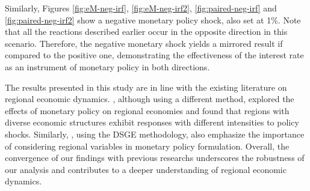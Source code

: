 \documentclass[../thesis.tex]{subfiles}
\begin{document}
Similarly, Figures \eqref{fig:eM-neg-irf}, \eqref{fig:eM-neg-irf2}, \eqref{fig:paired-neg-irf} and \eqref{fig:paired-neg-irf2} show a negative monetary policy shock, also set at 1\%. Note that all the reactions described earlier occur in the opposite direction in this scenario. Therefore, the negative monetary shock yields  a mirrored result if compared to the positive one, demonstrating the effectiveness of the interest rate as an instrument of monetary policy in both directions. %

The results presented in this study are in line with the existing literature on regional economic dynamics. \textcite{bertanha_efeitos_2008}, although using a different method, explored the effects of monetary policy on regional economies and found that regions with diverse economic structures exhibit responses with different intensities to policy shocks. Similarly, \textcite{osterno_uma_2022}, using the DSGE methodology, also emphasize the importance of considering regional variables in monetary policy formulation. Overall, the convergence of our findings with previous researchs underscores the robustness of our analysis and contributes to a deeper understanding of regional economic dynamics.

\begin{comment}
	
	\begin{align}
		&\Delta \hat{Z}_{M}      >0 \implies
		 \Delta \hat{R}_{}       >0 \implies
		 \Delta \hat{I}_{\eta}^D >0 \implies
		 \Delta \hat{C}_{\eta}   <0 \implies \nonumber \\
		&\Delta \hat{K}_{\eta}   <0 \implies 
		 \Delta \hat{L}_{\eta}^S > \Delta \hat{L}_{\eta}^D \implies
		 \Delta \hat{W}_{\eta}   <0 \implies
		 \Delta \hat{Y}_{\eta}   >0 \implies \nonumber \\
		&\Delta \hat{\lambda}_{\eta} <0 \implies
		 \Delta \hat{Q}_{\eta} >0 ; <0 \implies
		 \Delta \hat{P}_{\eta} >0 ; <0
	\end{align}
	
	 &  &  &  & \hat{C}_{\eta 1} & \hat{C}_{\eta 2} &  & \hat{Y}_{} & \hat{Z}_{A\eta} & 

&  &  & \hat{\pi}_{} &  &  & \hat{\pi}_{\eta}

	
\end{comment}
\end{document}
